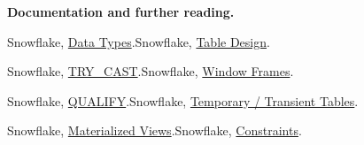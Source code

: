 \documentclass[11pt,twoside]{article}
\begin{document}
\textbf{Documentation and further reading.}\par\vspace{-1mm}
{\fontsize{8.2}{10.2}\selectfont
[1] Snowflake, \href{https://docs.snowflake.com/en/sql-reference/data-types}{Data Types}.\quad [1] Snowflake, \href{https://docs.snowflake.com/en/user-guide/table-considerations}{Table Design}.\quad \par
[2] Snowflake, \href{https://docs.snowflake.com/en/sql-reference/functions/try_cast}{TRY\_CAST}.\quad [3] Snowflake, \href{https://docs.snowflake.com/en/sql-reference/functions-window-syntax}{Window Frames}.\quad \par
[4] Snowflake, \href{https://docs.snowflake.com/en/sql-reference/constructs/qualify}{QUALIFY}.\quad [5] Snowflake, \href{https://docs.snowflake.com/en/user-guide/tables-temp-transient}{Temporary / Transient Tables}.\quad \par
[6] Snowflake, \href{https://docs.snowflake.com/en/user-guide/views-materialized}{Materialized Views}.\quad [7] Snowflake, \href{https://docs.snowflake.com/en/sql-reference/constraints}{Constraints}.\quad \par
}
\end{document}
